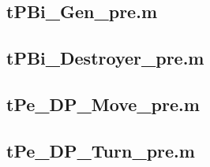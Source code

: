 \documentclass[runningheads,a4paper]{llncs}
\newcommand{\GPenSIM}{../GPenSIM}
\begin{document}
\subsection{tPBi\_Gen\_pre.m}
\label{app:tPBi_Gen_pre}


\subsection{tPBi\_Destroyer\_pre.m}
\label{app:tPBi_Destroyer_pre}


\subsection{tPe\_DP\_Move\_pre.m}
\label{app:tPe_DP_Move_pre}


\subsection{tPe\_DP\_Turn\_pre.m}
\label{app:tPe_DP_Turn_pre}

\end{document}
